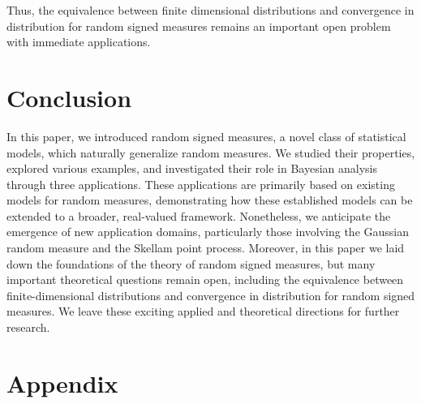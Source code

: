 \documentclass{article}
\theoremstyle{plain}
\theoremstyle{remark}
\begin{document}
Thus, the equivalence between finite dimensional distributions and convergence in distribution for random signed measures remains an important open problem with immediate applications.



\section{Conclusion}


In this paper, we introduced random signed measures, a novel class of statistical models, which naturally generalize random measures. We studied their properties, explored various examples, and investigated their role in Bayesian analysis through three applications. These applications are primarily based on existing models for random measures, demonstrating how these established models can be extended to a broader, real-valued framework. Nonetheless, we anticipate the emergence of new application domains, particularly those involving the Gaussian random measure and the Skellam point process. Moreover, in this paper we laid down the foundations of the theory of random signed measures, but many important theoretical questions remain open, including the equivalence between finite-dimensional distributions and convergence in distribution for random signed measures.
We leave these exciting applied and theoretical directions for further research.

\section*{Appendix}
\end{document}
